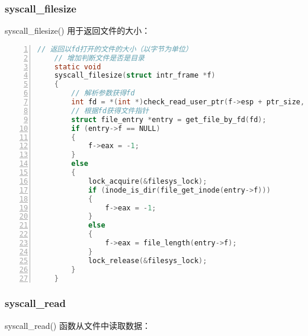 \documentclass{article}
\begin{document}
	\subsubsection{syscall\_filesize}
	
	syscall\_filesize() 用于返回文件的大小：
	
	\begin{lstlisting}[xleftmargin = 4em,xrightmargin = 4em, aboveskip = 1em, numbers = left, language = C,title=src/userprog/syscall.c - syscall\_filesize()]
    // 返回以fd打开的文件的大小（以字节为单位）
    // 增加判断文件是否是目录
    static void
    syscall_filesize(struct intr_frame *f)
    {
        // 解析参数获得fd
        int fd = *(int *)check_read_user_ptr(f->esp + ptr_size, sizeof(int));
        // 根据fd获得文件指针
        struct file_entry *entry = get_file_by_fd(fd);
        if (entry->f == NULL)
        {
            f->eax = -1;
        }
        else
        {
            lock_acquire(&filesys_lock);
            if (inode_is_dir(file_get_inode(entry->f)))
            {
                f->eax = -1;
            }
            else
            {
                f->eax = file_length(entry->f);
            }
            lock_release(&filesys_lock);
        }
    }
	\end{lstlisting}
	
	\subsubsection{syscall\_read}
	
	syscall\_read() 函数从文件中读取数据：
	
\end{document}
